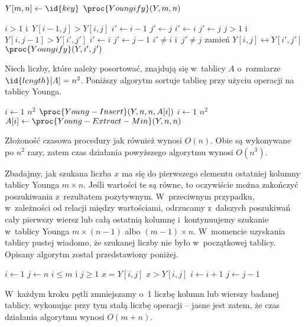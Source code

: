 \begin{codebox}
\li	$Y[m,n]\gets\id{key}$
\li $\proc{Youngify}(Y,m,n)$
\end{codebox}

\begin{codebox}
\li	\If $i>1$ i~$Y[i-1,j]>Y[i,j]$
\li		\Then
			$i'\gets i-1$
\li			$j'\gets j$
\li		\Else
			$i'\gets i$
\li			$j'\gets j$
		\End
\li	\If $j>1$ i~$Y[i,j-1]>Y[i',j']$
\li		\Then
			$i'\gets i$
\li			$j'\gets j-1$
		\End
\li	\If $i'\ne i$ i~$j'\ne j$
\li		\Then
			zamień $Y[i,j]\leftrightarrow Y[i',j']$
\li			$\proc{Youngify}(Y,i',j')$
		\End
\end{codebox}

\subproblem %
Niech liczby, które należy posortować, znajdują się w~tablicy $A$ o~rozmiarze $\id{length}[A]=n^2$. Poniższy algorytm sortuje tablicę przy użyciu operacji na tablicy Younga.
\begin{codebox}
\li	\For $i\gets1$ \To $n^2$
\li		\Do $\proc{Young-Insert}(Y,n,n,A[i])$
		\End
\li	\For $i\gets1$ \To $n^2$
\li		\Do $A[i]\gets\proc{Young-Extract-Min}(Y,n,n)$
		\End
\end{codebox}
Złożoność czasowa procedury  jak również  wynosi $O(n)$. Obie są wykonywane po $n^2$ razy, zatem czas działania powyższego algorytmu wynosi $O(n^3)$.

\subproblem %
Zbadajmy, jak szukana liczba $x$ ma się do pierwszego elementu ostatniej kolumny tablicy Younga $m\times n$. Jeśli wartości te są równe, to oczywiście można zakończyć poszukiwania z~rezultatem pozytywnym. W~przeciwnym przypadku, w~zależności od relacji między wartościami, odrzucamy z~dalszych poszukiwań cały pierwszy wiersz lub całą ostatnią kolumnę i~kontynuujemy szukanie w~tablicy Younga $m\times(n-1)$ albo $(m-1)\times n$. W~momencie uzyskania tablicy pustej wiadomo, że szukanej liczby nie było w~początkowej tablicy. Opisany algorytm został przedstawiony poniżej.
\begin{codebox}
\li	$i\gets1$
\li	$j\gets n$
\li	\While $i\le m$ i $j\ge1$
\li		\Do
			\If $x=Y[i,j]$
\li				\Then \Return {}
\li			\ElseIf $x>Y[i,j]$
\li				\Then $i\gets i+1$
\li			\ElseNoIf $j\gets j-1$
				\End
		\End
\li	\Return {}
\end{codebox}
W~każdym kroku pętli  zmniejszamy o~1 liczbę kolumn lub wierszy badanej tablicy, wykonując przy tym stałą liczbę operacji -- jasne jest zatem, że czas działania algorytmu wynosi $O(m+n)$.

\endinput
